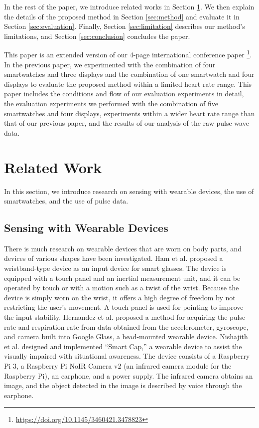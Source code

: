 \documentclass{ieeeaccess}
\begin{document}
In the rest of the paper, we introduce related works in Section \ref{sec:related}. We then explain the details of the proposed method in Section \ref{sec:method} and evaluate it in Section \ref{sec:evaluation}. Finally, Section \ref{sec:limitation} describes our method's limitations, and Section \ref{sec:conclusion} concludes the paper.\par

This paper is an extended version of our 4-page international conference paper \cite{disp2ppg}\footnote{\url{https://doi.org/10.1145/3460421.3478823}}. In the previous paper, we experimented with the combination of four smartwatches and three displays and the combination of one smartwatch and four displays to evaluate the proposed method within a limited heart rate range. This paper includes the conditions and flow of our evaluation experiments in detail, the evaluation experiments we performed with the combination of five smartwatches and four displays, experiments within a wider heart rate range than that of our previous paper, and the results of our analysis of the raw pulse wave data.

\section{Related Work}
\label{sec:related}
In this section, we introduce research on sensing with wearable devices, the use of smartwatches, and the use of pulse data.

\subsection{Sensing with Wearable Devices}
There is much research on wearable devices that are worn on body parts, and devices of various shapes have been investigated. Ham et al. \cite{smart_wristband} proposed a wristband-type device as an input device for smart glasses. The device is equipped with a touch panel and an inertial measurement unit, and it can be operated by touch or with a motion such as a twist of the wrist. Because the device is simply worn on the wrist, it offers a high degree of freedom by not restricting the user's movement. A touch panel is used for pointing to improve the input stability. Hernandez et al. \cite{bioglass} proposed a method for acquiring the pulse rate and respiration rate from data obtained from the accelerometer, gyroscope, and camera built into Google Glass, a head-mounted wearable device. Nishajith et al. \cite{smart_cap} designed and implemented ``Smart Cap,'' a wearable device to assist the visually impaired with situational awareness. The device consists of a Raspberry Pi 3, a Raspberry Pi NoIR Camera v2 (an infrared camera module for the Raspberry Pi), an earphone, and a power supply. The infrared camera obtains an image, and the object detected in the image is described by voice through the earphone.\par
\end{document}
